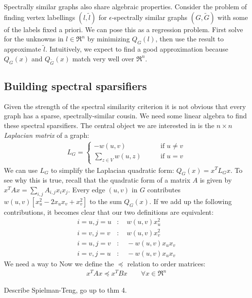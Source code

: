 \documentclass{article}
\begin{document}
Spectrally similar graphs also share algebraic properties. Consider the
problem of finding vertex labellings $(l, \tilde{l})$ for
$\epsilon$-spectrally similar graphs $(G, \tilde{G})$ with some of the
labels fixed a priori. We can pose this as a regression problem. First solve
for the unknowns in $l \in \Re^n$ by minimizing $Q_G(l)$, then use the
result to approximate $\tilde{l}$. Intuitively, we expect to find a good
approximation because $Q_G(x)$ and $Q_{\tilde{G}}(x)$ match very well over
$\Re^n$.

\subsection{Building spectral sparsifiers}

Given the strength of the spectral similarity criterion it is not obvious
that every graph has a sparse, spectrally-similar cousin. We need some
linear algebra to find these spectral sparsifiers. The central object we are
interested in is the $n \times n$ \textit{Laplacian matrix} of a graph:
\begin{align*}
    L_G =
    \begin{cases}
        -w(u, v) \qquad &\text{if } u \not= v \\
        \sum_{z \in V} w(u, z) \qquad &\text{if } u = v
    \end{cases}
\end{align*}
We can use $L_G$ to simplify the Laplacian quadratic form: $Q_G(x) =
x^TL_Gx$. To see why this is true, recall that the quadratic form of a
matrix $A$ is given by $x^TAx = \sum_{i,j} A_{i,j}x_ix_j$.  Every edge $(u,
v)$ in $G$ contributes $w(u, v)[x_u^2 - 2x_ux_v + x_v^2]$ to the sum
$Q_G(x)$. If we add up the following contributions, it becomes clear that
our two definitions are equivalent:
\begin{align*}
    i = u, j = u &:\quad w(u, v)x_u^2 \\
    i = v, j = v &:\quad w(u, v)x_v^2 \\
    i = u, j = v &:\quad -w(u, v)x_ux_v \\
    i = v, j = u &:\quad -w(u, v)x_ux_v
\end{align*}
We need a way to 
Now we define the $\preceq$ relation to order matrices:
\begin{align*}
    x^TAx \preceq x^TBx \qquad \forall{x \in \Re^n}
\end{align*}


Describe Spielman-Teng, go up to thm 4.
\end{document}
